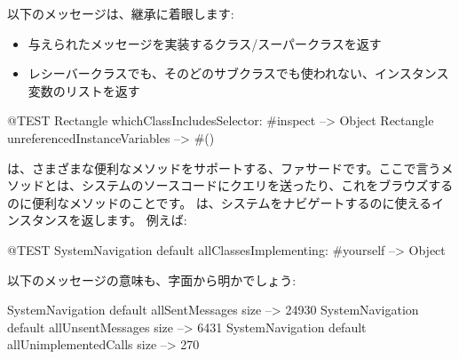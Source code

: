 \documentclass[a4paper,10pt,twoside]{book}
\begin{document}
以下のメッセージは、継承に着眼します: %
\begin{itemize}
\item {} 与えられたメッセージを実装するクラス/スーパークラスを返す
\item {}レシーバークラスでも、そのどのサブクラスでも使われない、インスタンス変数のリストを返す
\end{itemize}

\begin{code}{@TEST}
Rectangle whichClassIncludesSelector: #inspect --> Object
Rectangle unreferencedInstanceVariables            --> #()
\end{code}

は、さまざまな便利なメソッドをサポートする、ファサードです。ここで言うメソッドとは、システムのソースコードにクエリを送ったり、これをブラウズするのに便利なメソッドのことです。
 は、システムをナビゲートするのに使えるインスタンスを返します。
例えば:

\begin{code}{@TEST}
SystemNavigation default allClassesImplementing: #yourself --> {Object}
\end{code}

以下のメッセージの意味も、字面から明かでしょう:

\begin{code}{}
SystemNavigation default allSentMessages size          --> 24930
SystemNavigation default allUnsentMessages size      --> 6431
SystemNavigation default allUnimplementedCalls size --> 270
\end{code}
\end{document}
